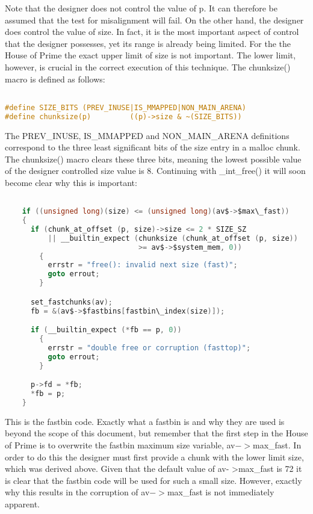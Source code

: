 \documentclass[12pt]{article}
\begin{document}
Note that the designer does not control the value of p. It can
therefore be assumed that the test for misalignment will fail. On
the other hand, the designer does control the value of size. In
fact, it is the most important aspect of control that the designer
possesses, yet its range is already being limited. For the the
House of Prime the exact upper limit of size is not important. The
lower limit, however, is crucial in the correct execution of this
technique. The chunksize() macro is defined as follows:
\begin{lstlisting}[language=C]

#define SIZE_BITS (PREV_INUSE|IS_MMAPPED|NON_MAIN_ARENA)
#define chunksize(p)         ((p)->size & ~(SIZE_BITS))
\end{lstlisting}
The PREV\_INUSE, IS\_MMAPPED and NON\_MAIN\_ARENA definitions
correspond to the three least significant bits of the size entry in
a malloc chunk. The chunksize() macro clears these three bits,
meaning the lowest possible value of the designer controlled size
value is 8. Continuing with \_int\_free() it will soon become clear
why this is important:
\begin{lstlisting}[language=C]

    if ((unsigned long)(size) <= (unsigned long)(av$->$max\_fast))
    {
      if (chunk_at_offset (p, size)->size <= 2 * SIZE_SZ
          || __builtin_expect (chunksize (chunk_at_offset (p, size))
                               >= av$->$system_mem, 0))
        {
          errstr = "free(): invalid next size (fast)";
          goto errout;
        }

      set_fastchunks(av);
      fb = &(av$->$fastbins[fastbin\_index(size)]);

      if (__builtin_expect (*fb == p, 0))
        {
          errstr = "double free or corruption (fasttop)";
          goto errout;
        }

      p->fd = *fb;
      *fb = p;
    }
\end{lstlisting}
This is the fastbin code. Exactly what a fastbin is and why they
are used is beyond the scope of this document, but remember that
the first step in the House of Prime is to overwrite the fastbin
maximum size variable, av$->$max\_fast. In order to do this the
designer must first provide a chunk with the lower limit size,
which was derived above. Given that the default value of av-
>max\_fast is 72 it is clear that the fastbin code will be used for
such a small size. However, exactly why this results in the
corruption of av$->$max\_fast is not immediately apparent.
\end{document}
